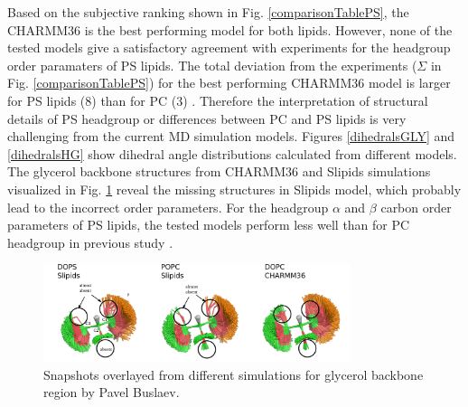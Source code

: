 \documentclass[aps,prl,superscriptaddress,twocolumn]{revtex4}
\begin{document}
Based on the subjective ranking shown in Fig. \ref{comparisonTablePS},
the CHARMM36 is the best performing model for both lipids.
However, none of the tested models give a satisfactory 
agreement with experiments for the headgroup order paramaters of 
PS lipids. The total deviation from the experiments ($\Sigma$ in Fig. \ref{comparisonTablePS})
for the best performing CHARMM36 model is larger for PS lipids (8)
than for PC (3) \cite{botan15}. Therefore the 
interpretation of structural details of PS headgroup or
differences between PC and PS lipids is very challenging 
from the current MD simulation models.
Figures \ref{dihedralsGLY} and \ref{dihedralsHG} show dihedral
angle distributions calculated from different models. 
The glycerol backbone structures from CHARMM36 and
Slipids simulations visualized in Fig. \ref{glycerol_buslaev} reveal the
missing structures in Slipids model, which probably lead to the incorrect
order parameters. For the headgroup $\alpha$ and $\beta$ carbon order parameters of PS lipids,
the tested models perform less well than for PC headgroup in previous
study \cite{botan15}.

\begin{figure}[]
  \centering
  \includegraphics[width=9.0cm]{../Figs/glycerol_buslaev.png}
  \caption{\label{glycerol_buslaev}
    Snapshots overlayed from different simulations for glycerol backbone region
    by Pavel Buslaev.
  }
\end{figure}
\end{document}
